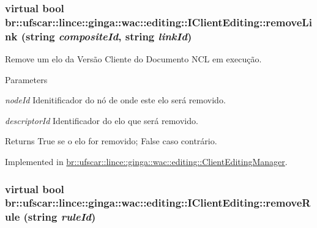 \hypertarget{classbr_1_1ufscar_1_1lince_1_1ginga_1_1wac_1_1editing_1_1IClientEditing_a99c3ab683d01ec8fecae2b01f7069bc4}{
\subsubsection[{removeLink}]{\setlength{\rightskip}{0pt plus 5cm}virtual bool br::ufscar::lince::ginga::wac::editing::IClientEditing::removeLink (string {\em compositeId}, \/  string {\em linkId})}}
\label{classbr_1_1ufscar_1_1lince_1_1ginga_1_1wac_1_1editing_1_1IClientEditing_a99c3ab683d01ec8fecae2b01f7069bc4}


Remove um elo da Versão Cliente do Documento NCL em execução. 


\begin{DoxyParams}{Parameters}
\item[{\em nodeId}]Idenitificador do nó de onde este elo será removido. \item[{\em descriptorId}]Identificador do elo que será removido. \end{DoxyParams}
\begin{DoxyReturn}{Returns}
True se o elo for removido; False caso contrário. 
\end{DoxyReturn}


Implemented in \hyperlink{classbr_1_1ufscar_1_1lince_1_1ginga_1_1wac_1_1editing_1_1ClientEditingManager_a11e5f1029545aa4c0435094cc59477cb}{br::ufscar::lince::ginga::wac::editing::ClientEditingManager}.

\hypertarget{classbr_1_1ufscar_1_1lince_1_1ginga_1_1wac_1_1editing_1_1IClientEditing_a1b9bb86e478437909dd6f5a77f2ff4b4}{
\subsubsection[{removeRule}]{\setlength{\rightskip}{0pt plus 5cm}virtual bool br::ufscar::lince::ginga::wac::editing::IClientEditing::removeRule (string {\em ruleId})}}
\label{classbr_1_1ufscar_1_1lince_1_1ginga_1_1wac_1_1editing_1_1IClientEditing_a1b9bb86e478437909dd6f5a77f2ff4b4}



